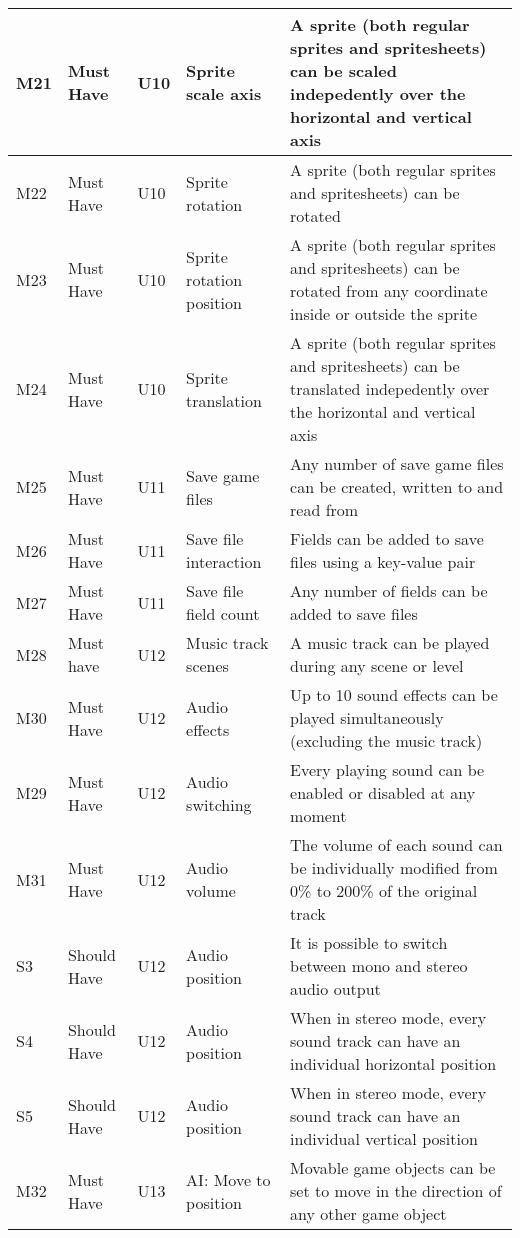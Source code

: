 \documentclass{article} %
\begin{document}
\begin{longtable}{|p{}|p{}|p{}|p{}|p{}|}
    M21 & Must Have & U10 & Sprite scale axis & A sprite (both regular sprites and spritesheets) can be scaled indepedently over the horizontal and vertical axis \\ \hline
    M22 & Must Have & U10 & Sprite rotation & A sprite (both regular sprites and spritesheets) can be rotated \\ \hline
    M23 & Must Have & U10 & Sprite rotation position & A sprite (both regular sprites and spritesheets) can be rotated from any coordinate inside or outside the sprite \\ \hline
    M24 & Must Have & U10 & Sprite translation & A sprite (both regular sprites and spritesheets) can be translated indepedently over the horizontal and vertical axis \\ \hline
    M25 & Must Have & U11 & Save game files & Any number of save game files can be created, written to and read from \\ \hline
    M26 & Must Have & U11 & Save file interaction & Fields can be added to save files using a key-value pair \\ \hline
    M27 & Must Have & U11 & Save file field count & Any number of fields can be added to save files \\ \hline
    M28 & Must have & U12 & Music track scenes & A music track can be played during any scene or level \\ \hline
    M30 & Must Have & U12 & Audio effects & Up to 10 sound effects can be played simultaneously (excluding the music track) \\ \hline
    M29 & Must Have & U12 & Audio switching & Every playing sound can be enabled or disabled at any moment \\ \hline
    M31 & Must Have & U12 & Audio volume & The volume of each sound can be individually modified from 0\% to 200\% of the original track \\ \hline
    S3 & Should Have & U12 & Audio position & It is possible to switch between mono and stereo audio output \\ \hline
    S4 & Should Have & U12 & Audio position & When in stereo mode, every sound track can have an individual horizontal position \\ \hline
    S5 & Should Have & U12 & Audio position & When in stereo mode, every sound track can have an individual vertical position \\ \hline
    M32 & Must Have & U13 & AI: Move to position & Movable game objects can be set to move in the direction of any other game object \\ \hline

\end{longtable}
\end{document}
